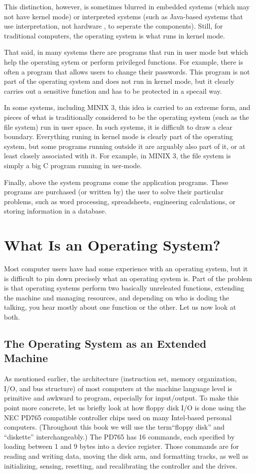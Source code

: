 \documentclass{book}
\begin{document}
This distinction, however, is sometimes blurred in embedded systems (which may not have kernel mode) 
or interpreted systems (such as Java-based systems that use interpretation, not hardware , to seperate the components).
Still, for traditional computers, the operating system is what runs in kernel mode.

That said, in many systems there are programs that run in user mode but which help the operating sytem or perform privileged functions.
For example, there is often a program that allows users to change their passwords.
This program is not part of the operating system and does not run in kernel mode, but it clearly carries out a sensitive function 
and has to be protected in a specail way.

In some systems, including MINIX 3, this idea is carried to an extreme form, 
and pieces of what is traditionally considered to be the operating system (such as the file system) run in user space.
In such systems, it is difficult to draw a clear boundary.
Everything runing in kernel mode is clearly part of the operating system, 
but some programs running outside it are arguably also part of it, or at least closely associated with it.
For example, in MINIX 3, the file system is simply a big C program running in uer-mode.

Finally, above the system programs come the application programs.
These programs are purchased (or written by) the user to solve their particular problems, 
such as word processing, spreadsheets, engineering calculations, or storing information in a database.

\section{What Is an Operating System?}
Most computer users have had some experience with an operating system, but it is difficult to pin down precisely what an operating system is.
Part of the problem is that operating systems perform two basically unreleated functions, extending the machine and managing resources, 
and depending on who is doding the talking, you hear mostly about one function or the other.
Let us now look at both.

\subsection{The Operating System as an Extended Machine}
As mentioned earlier, the architecture (instruction set, memory organization, I/O, and bus structure) of most computers 
at the machine language level is primitive and awkward to program, especially for input/output.
To make this point more concrete, let us briefly look at how floppy disk I/O is done 
using the NEC PD765 compatible controller chips used on many Intel-based personal computers.
(Throughout this book we will use the term``floppy disk'' and ``diskette'' interchangeably.)
The PD765 has 16 commands, each specified by loading between 1 and 9 bytes into a device register.
Those commands are for reading and writing data, moving the disk arm, and formatting tracks, 
as well as initializing, sensing, resetting, and recalibrating the controller and the drives.
\end{document}
